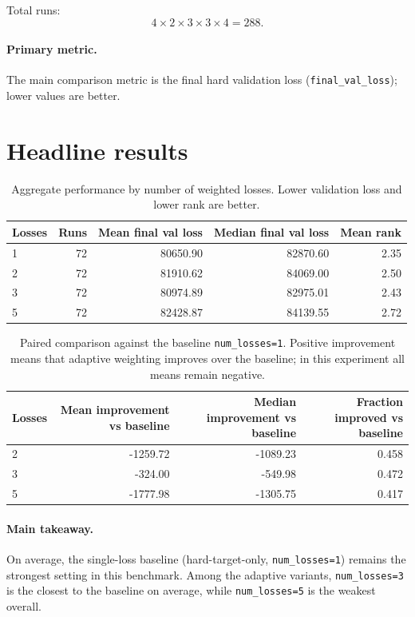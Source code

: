 Total runs:
\[
4 \times 2 \times 3 \times 3 \times 4 = 288.
\]

\paragraph{Primary metric.}
The main comparison metric is the final hard validation loss
(\texttt{final\_val\_loss}); lower values are better.

\section{Headline results}

\begin{table}[h]
\centering
\small
\begin{tabular}{lrrrr}
\toprule
Losses & Runs & Mean final val loss & Median final val loss & Mean rank \\
\midrule
1 & 72 & 80650.90 & 82870.60 & 2.35 \\
2 & 72 & 81910.62 & 84069.00 & 2.50 \\
3 & 72 & 80974.89 & 82975.01 & 2.43 \\
5 & 72 & 82428.87 & 84139.55 & 2.72 \\
\bottomrule
\end{tabular}
\caption{Aggregate performance by number of weighted losses. Lower validation loss and lower rank are better.}
\label{tab:meta-eggholder-u1-by-losses}
\end{table}

\begin{table}[h]
\centering
\small
\begin{tabular}{lrrr}
\toprule
Losses & Mean improvement vs baseline & Median improvement vs baseline & Fraction improved vs baseline \\
\midrule
2 & -1259.72 & -1089.23 & 0.458 \\
3 &  -324.00 &  -549.98 & 0.472 \\
5 & -1777.98 & -1305.75 & 0.417 \\
\bottomrule
\end{tabular}
\caption{Paired comparison against the baseline \texttt{num\_losses=1}. Positive improvement means that adaptive weighting improves over the baseline; in this experiment all means remain negative.}
\label{tab:meta-eggholder-u1-vs-baseline}
\end{table}

\paragraph{Main takeaway.}
On average, the single-loss baseline (hard-target-only, \texttt{num\_losses=1})
remains the strongest setting in this benchmark. Among the adaptive variants,
\texttt{num\_losses=3} is the closest to the baseline on average, while
\texttt{num\_losses=5} is the weakest overall.

